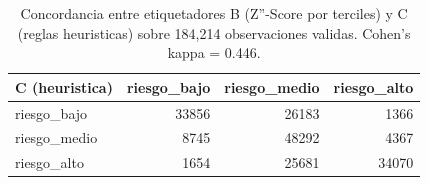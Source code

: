 \begin{table}
\caption{Concordancia entre etiquetadores B (Z''-Score por terciles) y C (reglas heuristicas) sobre 184,214 observaciones validas. Cohen's kappa = 0.446.}
\label{tab:concordancia_etiquetadores}
\begin{tabular}{lrrr}
\toprule
C (heuristica) & riesgo_bajo & riesgo_medio & riesgo_alto \\
\midrule
riesgo_bajo & 33856 & 26183 & 1366 \\
riesgo_medio & 8745 & 48292 & 4367 \\
riesgo_alto & 1654 & 25681 & 34070 \\
\bottomrule
\end{tabular}
\end{table}
